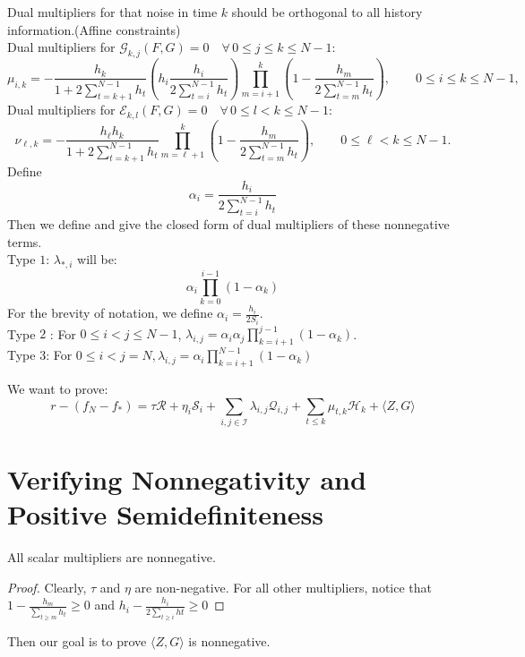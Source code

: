 Dual multipliers for that noise in time $k$ should be orthogonal to all history information.(Affine constraints)\\
Dual multipliers for $\mathcal{G}_{k,j}(F,G)=0  \quad \forall\, 0\le j\le k\le N-1:$
\[ \mu_{i,k} = - \frac{h_k} {1+2\sum_{t=k+1}^{N-1}h_t} \left( h_i \frac{h_i}{2\sum_{t=i}^{N-1}h_t} \right) \prod_{m=i+1}^{k}
\left( 1-\frac{h_m}{2\sum_{t=m}^{N-1}h_t} \right), \qquad 0\leq i\leq k\leq N-1,\]
Dual multipliers for $\mathcal{E}_{k,l}(F,G)=0  \quad \forall\, 0\le l<k\le N-1$:
\[\nu_{\ell,k} = - \frac{h_\ell h_k} {1+2\sum_{t=k+1}^{N-1}h_t}
\prod_{m=\ell+1}^{k} \left( 1-\frac{h_m}{2\sum_{t=m}^{N-1}h_t} \right), \qquad 0\leq \ell<k\leq N-1. \]
Define \[\alpha_i=\frac{h_i}{2\sum_{t=i}^{N-1}h_t}\]
Then we define and give the closed form of dual multipliers of these nonnegative terms.\\
Type $1$: $\lambda_{*,i}$ will be:
\[\alpha_i\prod_{k=0}^{i-1}(1-\alpha_k)\]
For the brevity of notation, we define $\alpha_i = \frac{h_i}{2 S_i}$.\\
Type $2$ : For $0\le i< j\le N-1$, $\lambda_{i,j} = \alpha_i \alpha_j \prod_{k=i+1}^{j-1}(1-\alpha_k)$.\\
Type $3$: For $0\le i < j = N, \lambda_{i,j} = \alpha_i \prod_{k=i+1}^{N-1} (1-\alpha_k)$

We want to prove:
\[r-(f_N-f_*)=\tau \mathcal{R}+ \eta_i\mathcal{S}_i+ \sum_{i,j\in \mathcal{I}} \lambda_{i,j} \mathcal{Q}_{i,j}+\sum_{t\le k} \mu_{t,k} \mathcal{H}_k + \langle Z,G \rangle\]

\section{Verifying Nonnegativity and Positive Semidefiniteness}





\begin{proposition} All scalar multipliers are nonnegative.
\begin{proof}
 Clearly, $\tau$ and $\eta$ are non-negative.
 For all other multipliers, notice that $1-\frac{h_m}{\sum_{t\ge m}h_t}\ge 0$ and
 $h_i-\frac{h_i}{2\sum_{t\ge i} ht} \ge 0$
\end{proof}
    
\end{proposition}
Then our goal is to prove $\langle Z,G \rangle$ is nonnegative.\\
